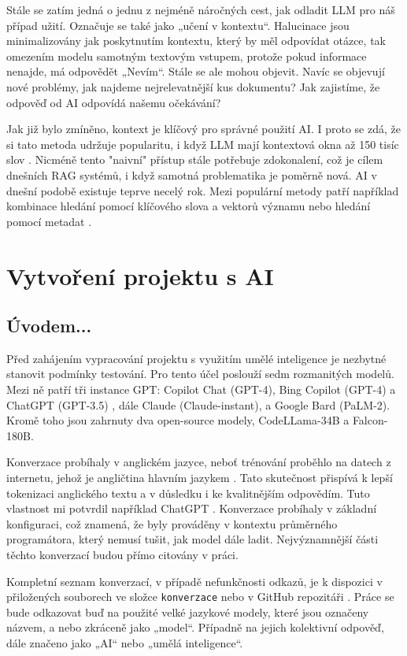 \documentclass[FM,DP]{tulthesis}
\begin{document}
		Stále se zatím jedná o jednu z nejméně náročných cest, jak odladit LLM pro náš případ užití. Označuje se také jako „učení v kontextu“. Halucinace jsou minimalizovány jak poskytnutím kontextu, který by měl odpovídat otázce, tak omezením modelu samotným textovým vstupem, protože pokud informace nenajde, má odpovědět „Nevím“. Stále se ale mohou objevit. Navíc se objevují nové problémy, jak najdeme nejrelevatnější kus dokumentu? Jak zajistíme, že odpověď od AI odpovídá našemu očekávání?
		
		Jak již bylo zmíněno, kontext je klíčový pro správné použití AI. I proto se zdá, že si tato metoda udržuje popularitu, i když LLM mají kontextová okna až 150 tisíc slov \cite{paper:RAG}. Nicméně tento "naivní" přístup stále potřebuje zdokonalení, což je cílem dnešních RAG systémů, i když samotná problematika je poměrně nová. AI v dnešní podobě existuje teprve necelý rok. Mezi populární metody patří například kombinace hledání pomocí klíčového slova a vektorů významu nebo hledání pomocí metadat \cite{paper:RAG}.
		
		\chapter{Vytvoření projektu s AI}
		\section{Úvodem...}
		Před zahájením vypracování projektu s využitím umělé inteligence je nezbytné stanovit podmínky testování. Pro tento účel poslouží sedm rozmanitých modelů. Mezi ně patří tři instance GPT: Copilot Chat (GPT-4), Bing Copilot (GPT-4) a ChatGPT (GPT-3.5) , dále Claude (Claude-instant), a Google Bard (PaLM-2). Kromě toho jsou zahrnuty dva open-source modely, CodeLLama-34B a Falcon-180B.
		
		Konverzace probíhaly v anglickém jazyce, neboť trénování proběhlo na datech z internetu, jehož je angličtina hlavním jazykem \cite{internetLanguages}. Tato skutečnost přispívá k lepší tokenizaci anglického textu a v důsledku i ke kvalitnějším odpovědím. Tuto vlastnost mi potvrdil například ChatGPT \cite{chatgpt_jazyk}. Konverzace probíhaly v základní konfiguraci, což znamená, že byly prováděny v kontextu průměrného programátora, který nemusí tušit, jak model dále ladit. Nejvýznamnější části těchto konverzací budou přímo citovány v práci. 

    Kompletní seznam konverzací, v případě nefunkčnosti odkazů, je k dispozici v přiložených souborech ve složce \verb|konverzace| nebo v GitHub repozitáři \cite{promptsRepo}. Práce se bude odkazovat buď na použité velké jazykové modely, které jsou označeny názvem, a nebo zkráceně jako „model“. Případně na jejich kolektivní odpověď, dále značeno jako „AI“ nebo „umělá inteligence“.
\end{document}

